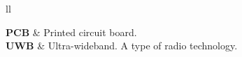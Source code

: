 \documentclass[
11pt, %
oneside, %
english, %
onehalfspacing, %
nolistspacing, %
hidelinks, %
headsepline, %
consistentlayout, %
table, %
]{MastersDoctoralThesis} %
\begin{document}

\tableofcontents %

\listoffigures %

\listoftables %


\begin{abbreviations}{ll} %

\textbf{PCB} & Printed circuit board. \\
\textbf{UWB} & Ultra-wideband. A type of radio technology. \\

\end{abbreviations}


%
%
%


%
%
%
%
\end{document}
